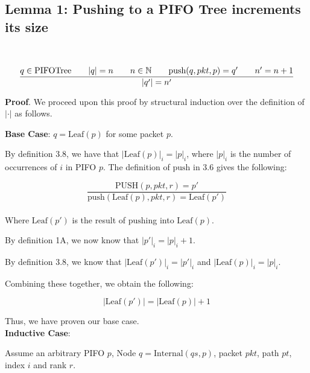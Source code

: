 \documentclass{article}
\begin{document}
\subsection{Lemma 1: Pushing to a PIFO Tree increments its size}

\par\

$$\frac{q \in \text{PIFOTree} \hspace{0.7cm} |q| = n \hspace{0.7cm} n \in \mathbb{N} \hspace{0.7cm} \text{push}(q, pkt, p) = q' \hspace{0.7cm} n' = n+1}{|q'| = n'}$$

\noindent \textbf{Proof}. We proceed upon this proof by structural induction over the definition of $|\cdot|$ as follows.\newline

\noindent \textbf{Base Case}: $q = \text{Leaf}(p)$ for some packet $p$.\newline

\noindent By definition 3.8, we have that $|\text{Leaf}(p)|_i = |p|_i$, where $|p|_i$ is the number of occurrences of $i$ in PIFO $p$. The definition of $\text{push}$ in 3.6 gives the following:

$$\frac{\text{PUSH}(p, pkt, r) = p'}{\text{push}(\text{Leaf}(p), pkt, r) = \text{Leaf}(p')}$$\\[-10pt]

\noindent Where $\text{Leaf}(p')$ is the result of $\text{push}$ing into $\text{Leaf}(p)$.\newline

\noindent By definition 1A, we now know that $|p'|_i = |p|_i + 1$.\newline

\noindent By definition 3.8, we know that $|\text{Leaf}(p')|_i = |p'|_i$ and $|\text{Leaf}(p)|_i = |p|_i$.\newline

\noindent Combining these together, we obtain the following:

$$|\text{Leaf}(p')| = |\text{Leaf}(p)| + 1$$

\noindent Thus, we have proven our base case.\\[10pt]

\noindent \textbf{Inductive Case}:\newline

\noindent Assume an arbitrary PIFO $p$, Node $q = \text{Internal}(qs, p)$, packet $pkt$, path $pt$, index $i$ and rank $r$.\newline
\end{document}
